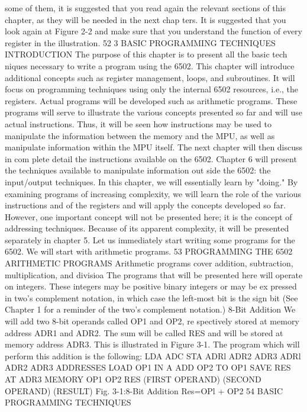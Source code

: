 \documentclass{book}
\begin{document}
some of them, it is suggested that you read again the relevant
sections of this chapter, as they will be needed in the next chap
ters. It is suggested that you look again at Figure 2-2 and make
sure that you understand the function of every register in the
illustration.
52
3
BASIC PROGRAMMING
TECHNIQUES
INTRODUCTION
The purpose of this chapter is to present all the basic tech
niques necessary to write a program using the 6502. This chapter
will introduce additional concepts such as register management,
loops, and subroutines. It will focus on programming techniques
using only the internal 6502 resources, i.e., the registers. Actual
programs will be developed such as arithmetic programs. These
programs will serve to illustrate the various concepts presented
so far and will use actual instructions. Thus, it will be seen how
instructions may be used to manipulate the information between
the memory and the MPU, as well as manipulate information
within the MPU itself. The next chapter will then discuss in com
plete detail the instructions available on the 6502. Chapter 6 will
present the techniques available to manipulate information out
side the 6502: the input/output techniques.
In this chapter, we will essentially learn by "doing." By examining
programs of increasing complexity, we will learn the role of the
various instructions and of the registers and will apply the concepts
developed so far. However, one important concept will not be
presented here; it is the concept of addressing techniques. Because of
its apparent complexity, it will be presented separately in chapter 5.
Let us immediately start writing some programs for the 6502.
We will start with arithmetic programs.
53
PROGRAMMING THE 6502
ARITHMETIC PROGRAMS
Arithmetic programs cover addition, subtraction, multiplication,
and divisioa The programs that will be presented here will operate on
integers. These integers may be positive binary integers or may be ex
pressed in two's complement notation, in which case the left-most bit
is the sign bit (See Chapter 1 for a reminder of the two's complement
notation.)
8-Bit Addition
We will add two 8-bit operands called OP1 and OP2, re
spectively stored at memory address ADR1 and ADR2. The sum
will be called RES and will be stored at memory address ADR3.
This is illustrated in Figure 3-1. The program which will perform
this addition is the following:
LDA
ADC
STA
ADRl
ADR2
ADR3
ADRl
ADR2
ADR3
ADDRESSES
LOAD OP1 IN A
ADD OP2 TO OP1
SAVE RES AT ADR3
MEMORY
OP1
OP2
RES
(FIRST OPERAND)
(SECOND OPERAND)
(RESULT)
Fig. 3-1:8-Bit Addition Res=OPl + OP2
54
BASIC PROGRAMMING TECHNIQUES
\end{document}
